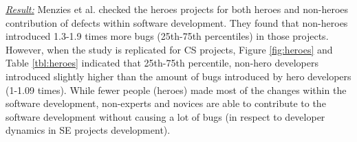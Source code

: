 \documentclass[sigconf,review,anonymous]{acmart}
\begin{document}
\begin{table}[!t]
\begin{center}
\caption{The table summarizes of Figure \ref{fig:heroes} and stratifies the data according to 25th, 50th, and 75th percentiles of buggy percentages introduced through code and social interaction.}
\label{tbl:heroes}
\end{center}
\end{table}


\noindent \textit{\underline{Result:}} Menzies et al. \cite{majumder19_heroes} checked the heroes projects for both heroes and non-heroes contribution of defects within software development. They found that non-heroes introduced 1.3-1.9 times more bugs (25th-75th percentiles) in those projects. However, when the study is replicated for CS projects,  Figure \ref{fig:heroes} and Table \ref{tbl:heroes} indicated that 25th-75th percentile, non-hero developers introduced slightly higher than the amount of bugs introduced by hero developers (1-1.09 times). While fewer people (heroes) made most of the changes within the software development, non-experts and novices are able to contribute to the software development without causing a lot of bugs (in respect to developer dynamics in SE projects development).  
\end{document}
